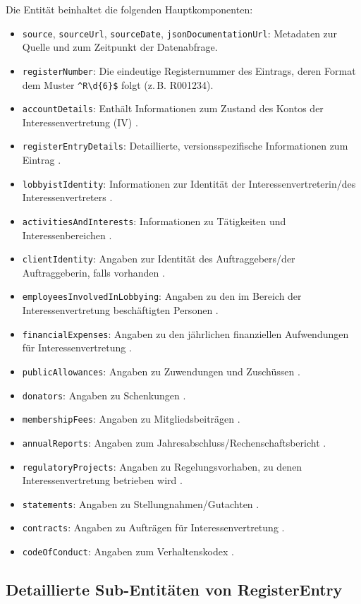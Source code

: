 \documentclass[12pt,twoside=false,a4paper,parskip]{scrbook}
\begin{document}
Die Entität beinhaltet die folgenden Hauptkomponenten:
\begin{itemize}
    \item \texttt{source}, \texttt{sourceUrl}, \texttt{sourceDate}, \texttt{jsonDocumentationUrl}: Metadaten zur Quelle und zum Zeitpunkt der Datenabfrage.
    \item \texttt{registerNumber}: Die eindeutige Registernummer des Eintrags, deren Format dem Muster \verb|^R\d{6}$| folgt (z.\,B. R001234).
    \item \texttt{accountDetails}: Enthält Informationen zum Zustand des Kontos der Interessenvertretung (IV) .
    \item \texttt{registerEntryDetails}: Detaillierte, versionsspezifische Informationen zum Eintrag .
    \item \texttt{lobbyistIdentity}: Informationen zur Identität der Interessenvertreterin/des Interessenvertreters .
    \item \texttt{activitiesAndInterests}: Informationen zu Tätigkeiten und Interessenbereichen .
    \item \texttt{clientIdentity}: Angaben zur Identität des Auftraggebers/der Auftraggeberin, falls vorhanden .
    \item \texttt{employeesInvolvedInLobbying}: Angaben zu den im Bereich der Interessenvertretung beschäftigten Personen .
    \item \texttt{financialExpenses}: Angaben zu den jährlichen finanziellen Aufwendungen für Interessenvertretung .
    \item \texttt{publicAllowances}: Angaben zu Zuwendungen und Zuschüssen .
    \item \texttt{donators}: Angaben zu Schenkungen .
    \item \texttt{membershipFees}: Angaben zu Mitgliedsbeiträgen .
    \item \texttt{annualReports}: Angaben zum Jahresabschluss/Rechenschaftsbericht .
    \item \texttt{regulatoryProjects}: Angaben zu Regelungsvorhaben, zu denen Interessenvertretung betrieben wird .
    \item \texttt{statements}: Angaben zu Stellungnahmen/Gutachten .
    \item \texttt{contracts}: Angaben zu Aufträgen für Interessenvertretung .
    \item \texttt{codeOfConduct}: Angaben zum Verhaltenskodex .
\end{itemize}

\subsection{Detaillierte Sub-Entitäten von RegisterEntry}
\end{document}
